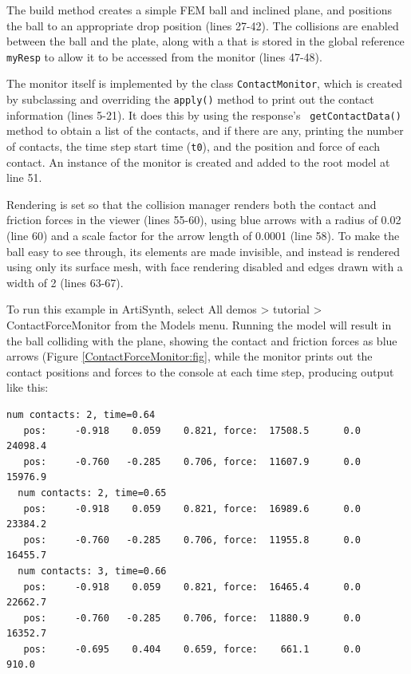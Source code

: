 \lstset{numbers=left} 
\iflatexml

\else

\fi
\lstset{numbers=none}

The build method creates a simple FEM ball and inclined plane, and
positions the ball to an appropriate drop position (lines 27-42).  The
collisions are enabled between the ball and the plate, along
with a 
that is stored in the global reference {\tt myResp} to allow it to be
accessed from the monitor (lines 47-48). 

The monitor itself is implemented by the class {\tt ContactMonitor},
which is created by subclassing
and overriding the {\tt apply()} method to print out the contact
information (lines 5-21). It does this by using the response's {\tt
getContactData()} method to obtain a list of the contacts, and if
there are any, printing the number of contacts, the time step start
time ({\tt t0}), and the position and force of each contact.  An
instance of the monitor is created and added to the root model at line
51.

Rendering is set so that the collision manager renders both the
contact and friction forces in the viewer (lines 55-60), using blue
arrows with a radius of 0.02 (line 60) and a scale factor for the
arrow length of 0.0001 (line 58). To make the ball easy to see
through, its elements are made invisible, and instead is rendered
using only its surface mesh, with face rendering disabled and edges
drawn with a width of 2 (lines 63-67).

To run this example in ArtiSynth, select {\sf All demos > tutorial >
ContactForceMonitor} from the {\sf Models} menu. Running the model
will result in the ball colliding with the plane, showing the contact
and friction forces as blue arrows
(Figure \ref{ContactForceMonitor:fig}, while the monitor prints out
the contact positions and forces to the console at each time step,
producing output like this:
%
\begin{lstlisting}[]
  num contacts: 2, time=0.64
   pos:     -0.918    0.059    0.821, force:  17508.5      0.0  24098.4
   pos:     -0.760   -0.285    0.706, force:  11607.9      0.0  15976.9
  num contacts: 2, time=0.65
   pos:     -0.918    0.059    0.821, force:  16989.6      0.0  23384.2
   pos:     -0.760   -0.285    0.706, force:  11955.8      0.0  16455.7
  num contacts: 3, time=0.66
   pos:     -0.918    0.059    0.821, force:  16465.4      0.0  22662.7
   pos:     -0.760   -0.285    0.706, force:  11880.9      0.0  16352.7
   pos:     -0.695    0.404    0.659, force:    661.1      0.0    910.0
\end{lstlisting}
%


